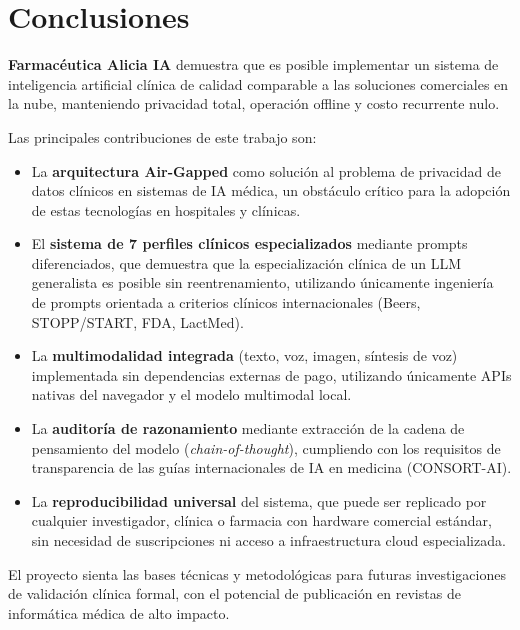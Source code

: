 \documentclass[12pt,a4paper]{article}
\begin{document}
\newpage

\section{Conclusiones}

\textbf{Farmacéutica Alicia IA} demuestra que es posible implementar un sistema de inteligencia
artificial clínica de calidad comparable a las soluciones comerciales en la nube, manteniendo
privacidad total, operación offline y costo recurrente nulo.

Las principales contribuciones de este trabajo son:

\begin{itemize}
  \item La \textbf{arquitectura Air-Gapped} como solución al problema de privacidad de datos
    clínicos en sistemas de IA médica, un obstáculo crítico para la adopción de estas tecnologías
    en hospitales y clínicas.

  \item El \textbf{sistema de 7 perfiles clínicos especializados} mediante prompts diferenciados,
    que demuestra que la especialización clínica de un LLM generalista es posible sin reentrenamiento,
    utilizando únicamente ingeniería de prompts orientada a criterios clínicos internacionales
    (Beers, STOPP/START, FDA, LactMed).

  \item La \textbf{multimodalidad integrada} (texto, voz, imagen, síntesis de voz) implementada
    sin dependencias externas de pago, utilizando únicamente APIs nativas del navegador y el
    modelo multimodal local.

  \item La \textbf{auditoría de razonamiento} mediante extracción de la cadena de pensamiento del
    modelo (\textit{chain-of-thought}), cumpliendo con los requisitos de transparencia de las
    guías internacionales de IA en medicina (CONSORT-AI).

  \item La \textbf{reproducibilidad universal} del sistema, que puede ser replicado por cualquier
    investigador, clínica o farmacia con hardware comercial estándar, sin necesidad de suscripciones
    ni acceso a infraestructura cloud especializada.
\end{itemize}

El proyecto sienta las bases técnicas y metodológicas para futuras investigaciones de validación
clínica formal, con el potencial de publicación en revistas de informática médica de alto impacto.
\end{document}
